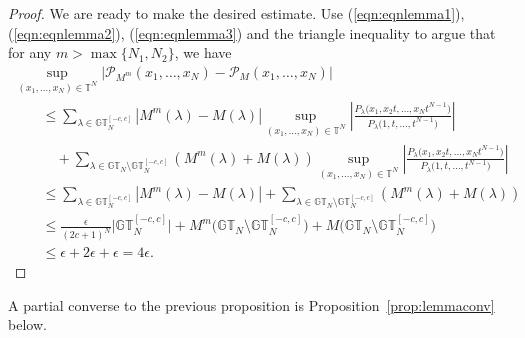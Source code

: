 \documentclass[pdftex]{sigma}
\numberwithin{equation}{section}
\newcommand{\GT}{\mathbb{GT}}
\newcommand{\PPP}{\mathcal{P}}
\newcommand{\TT}{\mathbb{T}}
\begin{document}
\begin{proof}
We are ready to make the desired estimate. Use (\ref{eqn:eqnlemma1}), (\ref{eqn:eqnlemma2}), (\ref{eqn:eqnlemma3}) and the triangle inequality to argue that for any $m > \max\{N_1, N_2\}$, we have
\begin{gather}
\sup_{(x_1, \dots, x_N)\in\TT^N}{ \left| \PPP_{M^m}(x_1, \dots, x_N) - \PPP_M(x_1, \dots, x_N) \right| }\nonumber\\
\qquad{} \leq \sum_{\lambda\in\GT_N^{[-c, c]}}{|M^m(\lambda) - M(\lambda)|\sup_{(x_1, \dots, x_N)\in\TT^N}{ \left|\frac{P_{\lambda}\big(x_1, x_2t, \dots, x_Nt^{N-1}\big)}{P_{\lambda}\big(1, t, \dots, t^{N-1}\big)}\right| }}\nonumber\\
\qquad\quad{} + \sum_{\lambda\in\GT_N\setminus\GT_N^{[-c, c]}}{ \left( M^m(\lambda) + M(\lambda) \right)\sup_{(x_1, \dots, x_N)\in\TT^N}{ \left|\frac{P_{\lambda}\big(x_1, x_2t, \dots, x_Nt^{N-1}\big)}{P_{\lambda}\big(1, t, \dots, t^{N-1}\big)}\right| }}\nonumber\\
\qquad{} \leq \sum_{\lambda\in\GT_N^{[-c, c]}}{|M^m(\lambda) - M(\lambda)|} + \sum_{\lambda\in\GT_N\setminus\GT_N^{[-c, c]}}{\left(M^m(\lambda) + M(\lambda)\right)}\nonumber\\
\qquad{} \leq \frac{\epsilon}{(2c+1)^N}\big| \GT_N^{[-c, c]} \big| + M^m\big(\GT_N \setminus \GT_N^{[-c, c]}\big) + M\big(\GT_N \setminus \GT_N^{[-c, c]}\big)\label{eqns:estimates1}\\
\qquad{} \leq \epsilon + 2\epsilon + \epsilon = 4\epsilon.\tag*{\qed}
\end{gather}\renewcommand{\qed}{}
\end{proof}

A partial converse to the previous proposition is Proposition~\ref{prop:lemmaconv} below.
\end{document}
